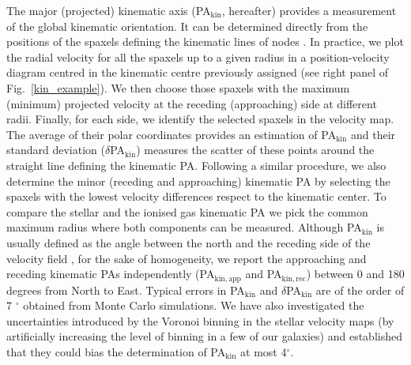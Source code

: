 \documentclass[longauth,traditabstract]{aa}
\begin{document}
The major (projected) kinematic axis (PA$_{\mathrm{kin}}$, hereafter) provides a measurement of the global kinematic orientation. It can be determined directly from the positions of the spaxels defining the kinematic lines of nodes \citep{1992ApJ...387..503N}. In practice, we plot the radial velocity for all the spaxels up to a given radius in a position-velocity diagram centred in the kinematic centre previously assigned (see right panel of Fig.~\ref{kin_example}). We then choose those spaxels with the maximum (minimum) projected velocity at the receding (approaching) side at different radii. Finally, for each side, we identify the selected spaxels in the velocity map. The average of their polar coordinates provides an estimation of PA$_{\mathrm{kin}}$ and their standard deviation ($\delta$PA$_{\mathrm{kin}}$) measures the scatter of these points around the straight line defining the kinematic PA. Following a similar procedure, we also determine the minor (receding and approaching) kinematic PA by selecting the spaxels with the lowest velocity differences respect to the kinematic center. To compare the stellar and the ionised gas kinematic PA we pick the common maximum radius where both components can be measured. Although PA$_{\mathrm{kin}}$ is usually defined as the angle between the north and the receding side of the velocity field \citep[e.g., ][]{1997MNRAS.292..349S}, for the sake of homogeneity, we report the approaching and receding kinematic PAs independently (PA$_{\mathrm{kin,app}}$ and PA$_{\mathrm{kin,rec}}$) between 0 and 180 degrees from North to East. Typical errors in PA$_{\mathrm{kin}}$ and $\delta$PA$_{\mathrm{kin}}$ are of the order of 7 $^\circ$ obtained from Monte Carlo simulations. We have also investigated the uncertainties introduced by the Voronoi binning in the stellar velocity maps (by artificially increasing the level of binning in a few of our galaxies) and established that they could bias the determination of PA$_{\mathrm{kin}}$ at most 4$^\circ$. 
\end{document}

